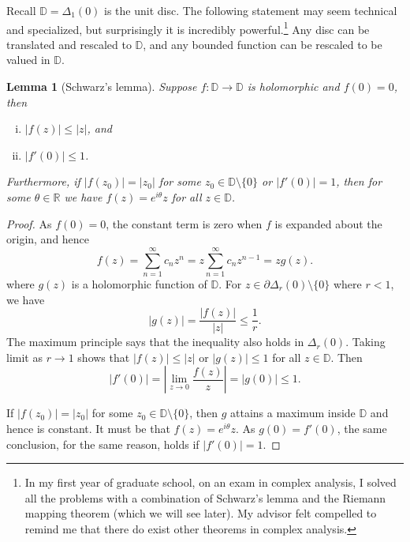 \documentclass[12pt,openany]{book}
\newcommand{\sabs}[1]{\lvert {#1} \rvert}
\newcommand{\abs}[1]{\left\lvert {#1} \right\rvert}
\newcommand{\R}{{\mathbb{R}}}
\newcommand{\D}{{\mathbb{D}}}
\theoremstyle{plain}
\newtheorem{lemma}[thm]{Lemma}
\theoremstyle{remark}
\theoremstyle{definition}
\theoremstyle{exercise}
\theoremstyle{example}
\begin{document}
Recall $\D = \Delta_1(0)$ is the unit disc.  The following statement may
seem technical and specialized, but surprisingly it is incredibly
powerful.\footnote{In my first year of graduate school, on an exam in complex
analysis, I solved all the problems with a combination of
Schwarz's lemma and
the Riemann
mapping theorem (which we will see later).  My advisor
felt compelled to remind me that there do exist other theorems in complex
analysis.}
Any disc can be translated and rescaled to $\D$, and any
bounded function can be rescaled to be valued in $\D$.

\begin{lemma}[Schwarz's lemma]
Suppose $f \colon \D \to \D$ is holomorphic and $f(0) = 0$,
then 
\begin{enumerate}[(i)]
\item $\sabs{f(z)} \leq \sabs{z}$, and
\item $\sabs{f'(0)} \leq 1$.
\end{enumerate}
Furthermore, if $\sabs{f(z_0)} = \sabs{z_0}$ for some $z_0 \in \D \setminus
\{ 0 \}$
or $\sabs{f'(0)} = 1$, then
for some $\theta \in \R$ we have $f(z) =
e^{i\theta} z$ for all $z \in \D$.
\end{lemma}

\begin{proof}
As $f(0) = 0$, the constant term is zero when $f$ is expanded about the
origin, and hence
\begin{equation*}
f(z) = \sum_{n=1}^\infty c_n z^n = z \sum_{n=1}^\infty c_n z^{n-1} = z g(z) .
\end{equation*}
where $g(z)$ is a holomorphic function of $\D$.  For
$z \in \partial \Delta_r(0) \setminus \{ 0 \}$
where $r < 1$, we have
\begin{equation*}
\sabs{g(z)} = \frac{\sabs{f(z)}}{\sabs{z}} \leq \frac{1}{r} .
\end{equation*}
The maximum principle says that the inequality also holds in $\Delta_r(0)$.
Taking limit as $r \to 1$ shows that $\sabs{f(z)} \leq \sabs{z}$ or
$\sabs{g(z)} \leq 1$ for all $z
\in \D$.  Then
\begin{equation*}
\abs{f'(0)}
=
\abs{\lim_{z \to 0} \frac{f(z)}{z}} = \sabs{g(0)} \leq 1 .
\end{equation*}

If $\sabs{f(z_0)} = \sabs{z_0}$ for some $z_0 \in \D \setminus \{ 0 \}$,
then $g$ attains a maximum inside $\D$ and hence is constant.
It must be that $f(z) = e^{i \theta} z$.
As $g(0) = f'(0)$, the same conclusion, for the same reason,
holds if $\sabs{f'(0)} = 1$.
\end{proof}
\end{document}
